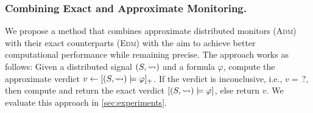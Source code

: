\vspace{-0.5em}
\subsubsection{Combining Exact and Approximate Monitoring.}
We propose a method that combines approximate distributed monitors (\textsc{Adm}) with their exact counterparts (\textsc{Edm}) with the aim to achieve better computational performance while remaining precise.
The approach works as follows:
Given a distributed signal $(S,{\rightsquigarrow})$ and a formula $\varphi$, compute the approximate verdict $v \gets [(S,{\rightsquigarrow}) \models \varphi]_+$.
If the verdict is inconclusive, i.e., $v = {\,?}$, then compute and return the exact verdict $[(S,{\rightsquigarrow}) \models \varphi]$, else return $v$.
We evaluate this approach in \cref{sec:experiments}.

